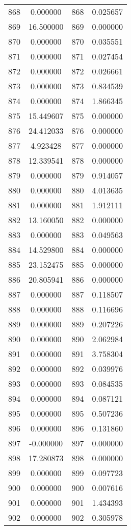 \documentclass[12pt]{article}
\begin{document}
\begin{longtable}{@{}cccc@{}}
868 & 0.000000 & 868 & 0.025657 \\
869 & 16.500000 & 869 & 0.000000 \\
870 & 0.000000 & 870 & 0.035551 \\
871 & 0.000000 & 871 & 0.027454 \\
872 & 0.000000 & 872 & 0.026661 \\
873 & 0.000000 & 873 & 0.834539 \\
874 & 0.000000 & 874 & 1.866345 \\
875 & 15.449607 & 875 & 0.000000 \\
876 & 24.412033 & 876 & 0.000000 \\
877 & 4.923428 & 877 & 0.000000 \\
878 & 12.339541 & 878 & 0.000000 \\
879 & 0.000000 & 879 & 0.914057 \\
880 & 0.000000 & 880 & 4.013635 \\
881 & 0.000000 & 881 & 1.912111 \\
882 & 13.160050 & 882 & 0.000000 \\
883 & 0.000000 & 883 & 0.049563 \\
884 & 14.529800 & 884 & 0.000000 \\
885 & 23.152475 & 885 & 0.000000 \\
886 & 20.805941 & 886 & 0.000000 \\
887 & 0.000000 & 887 & 0.118507 \\
888 & 0.000000 & 888 & 0.116696 \\
889 & 0.000000 & 889 & 0.207226 \\
890 & 0.000000 & 890 & 2.062984 \\
891 & 0.000000 & 891 & 3.758304 \\
892 & 0.000000 & 892 & 0.039976 \\
893 & 0.000000 & 893 & 0.084535 \\
894 & 0.000000 & 894 & 0.087121 \\
895 & 0.000000 & 895 & 0.507236 \\
896 & 0.000000 & 896 & 0.131860 \\
897 & -0.000000 & 897 & 0.000000 \\
898 & 17.280873 & 898 & 0.000000 \\
899 & 0.000000 & 899 & 0.097723 \\
900 & 0.000000 & 900 & 0.007616 \\
901 & 0.000000 & 901 & 1.434393 \\
902 & 0.000000 & 902 & 0.305978 \\

\end{longtable}
\end{document}
